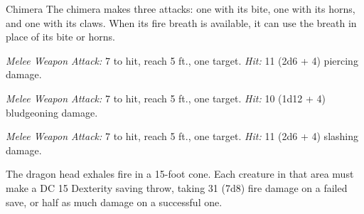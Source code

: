 \documentclass[10pt,a4paper,twoside,bg=print,twocolumn,openany,nodeprecatedcode]{dndbook}
\begin{document}
\begin{DndMonster}[float=t]{Chimera}
\DndMonsterBasics[
armor-class = {14 (natural armor)},
hit-points = {\DndDice{12d10 + 48}},
speed = {30 ft., fly 60 ft.}
]
\DndMonsterAbilityScores[
 str = 19,
 dex = 11,
 con = 19,
 int = 3,
 wis = 14,
 cha = 10
]
\DndMonsterDetails[
skills = {Perception +8},
senses = {darkvision 60 ft., passive perception 18},
languages = {understands Draconic but can't speak},
challenge = 6,
]
The chimera makes three attacks: one with its bite, one with its horns, and one with its claws. When its fire breath is available, it can use the breath in place of its bite or horns.

\textsl{Melee Weapon Attack:} 7 to hit, reach 5 ft., one target. \textsl{Hit:} 11 (2d6 + 4) piercing damage.

\textsl{Melee Weapon Attack:} 7 to hit, reach 5 ft., one target. \textsl{Hit:} 10 (1d12 + 4) bludgeoning damage.

\textsl{Melee Weapon Attack:} 7 to hit, reach 5 ft., one target. \textsl{Hit:} 11 (2d6 + 4) slashing damage.

The dragon head exhales fire in a 15-foot cone. Each creature in that area must make a DC 15 Dexterity saving throw, taking 31 (7d8) fire damage on a failed save, or half as much damage on a successful one.

\end{DndMonster}
\end{document}
